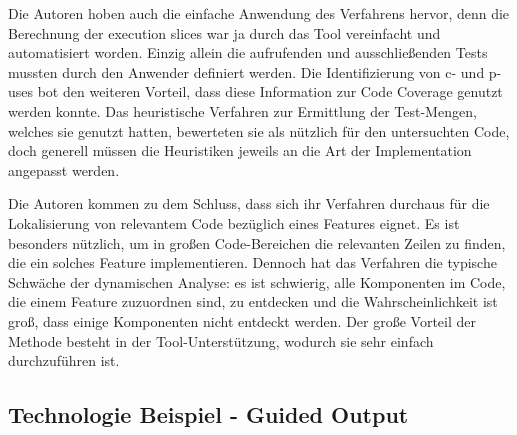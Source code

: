 \documentclass[runningheads,a4paper]{llncs}
\begin{document}
Die Autoren hoben auch die einfache Anwendung des Verfahrens hervor, denn die Berechnung der execution slices war ja durch das Tool vereinfacht und automatisiert worden. Einzig allein die aufrufenden und ausschließenden Tests mussten durch den Anwender definiert werden. Die Identifizierung von c- und p-uses bot den weiteren Vorteil, dass diese Information zur Code Coverage genutzt werden konnte. Das heuristische Verfahren zur Ermittlung der Test-Mengen, welches sie genutzt hatten, bewerteten sie als nützlich für den untersuchten Code, doch generell müssen die Heuristiken jeweils an die Art der Implementation angepasst werden.

Die Autoren kommen zu dem Schluss, dass sich ihr Verfahren durchaus für die Lokalisierung von relevantem Code bezüglich eines Features eignet. Es ist besonders nützlich, um in großen Code-Bereichen die relevanten Zeilen zu finden, die ein solches Feature implementieren. Dennoch hat das Verfahren die typische Schwäche der dynamischen Analyse: es ist schwierig, alle Komponenten im Code, die einem Feature zuzuordnen sind, zu entdecken und die Wahrscheinlichkeit ist groß, dass einige Komponenten nicht entdeckt werden. Der große Vorteil der Methode besteht in der Tool-Unterstützung, wodurch sie sehr einfach durchzuführen ist. 

\subsection*{Technologie Beispiel - Guided Output}
\end{document}

